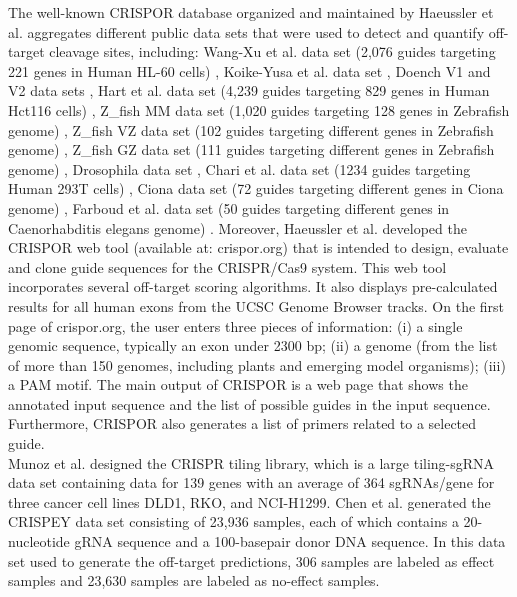 \documentclass[unnumsec,webpdf,contemporary,large]{oup-authoring-template}
\theoremstyle{thmstyleone}%
\theoremstyle{thmstyletwo}%
\theoremstyle{thmstylethree}%
\begin{document}
The well-known CRISPOR database organized and maintained by Haeussler et al. \cite{haeussler2016evaluation} aggregates different public data sets that were used to detect and quantify off-target cleavage sites, including: Wang-Xu et al. data set (2,076 guides targeting 221 genes in Human HL-60 cells) \cite{wang2014genetic, xu2015sequence}, Koike-Yusa et al. data set \cite{koike2014genome}, Doench V1 and V2 data sets \cite{doench2014rational, doench2016optimized}, Hart et al. data set (4,239 guides targeting 829 genes in Human Hct116 cells) \cite{hart2015high}, Z\_fish MM data set (1,020 guides targeting 128 genes in Zebrafish genome) \cite{moreno2015crisprscan}, Z\_fish VZ data set (102 guides targeting different genes in Zebrafish genome) \cite{varshney2015high}, Z\_fish GZ data set (111 guides targeting different genes in Zebrafish genome) \cite{gagnon2014efficient}, Drosophila data set \cite{ren2014enhanced}, Chari et al. data set (1234 guides targeting Human 293T cells) \cite{chari2015unraveling}, Ciona data set (72 guides targeting different genes in Ciona genome) \cite{gandhi2016rational}, Farboud et al. data set (50 guides targeting different genes in Caenorhabditis elegans genome) \cite{farboud2015dramatic}. Moreover, Haeussler et al. \cite{haeussler2016evaluation} developed the CRISPOR web tool (available at: crispor.org) that is intended to design, evaluate and clone guide sequences for the CRISPR/Cas9 system. This web tool incorporates several off-target scoring algorithms. It also displays pre-calculated results for all human exons from the UCSC Genome Browser tracks. On the first page of crispor.org, the user enters three pieces of information: (i) a single genomic sequence, typically an exon under 2300 bp; (ii) a genome (from the list of more than 150 genomes, including plants and emerging model organisms); (iii) a PAM motif. The main output of CRISPOR is a web page that shows the annotated input sequence and the list of possible guides in the input sequence. Furthermore, CRISPOR also generates a list of primers related to a selected guide. \\
Munoz et al. \cite{munoz2016crispr} designed the CRISPR tiling library, which is a large tiling-sgRNA data set containing data for 139 genes with an average of 364 sgRNAs/gene for three cancer cell lines DLD1, RKO, and NCI-H1299. Chen et al. \cite{chen1optimizing} generated the CRISPEY data set consisting of 23,936 samples, each of which contains a 20-nucleotide gRNA sequence and a 100-basepair donor DNA sequence. In this data set used to generate the off-target predictions, 306 samples are labeled as effect samples and 23,630 samples are labeled as no-effect samples.  %
\end{document}

